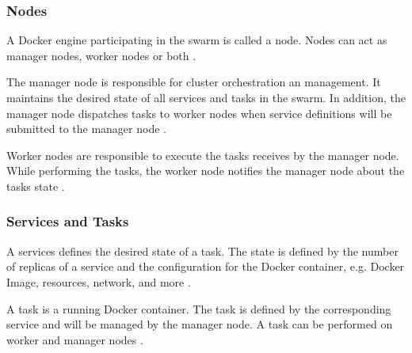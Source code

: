 \subsubsection{Nodes}
A Docker engine participating in the swarm is called a node.
Nodes can act as manager nodes, worker nodes or both \cite{Docker2020Docs}.


The manager node is responsible for cluster orchestration an management. It maintains the desired state of all services and tasks in the swarm. In addition, the manager node dispatches tasks to worker nodes when service definitions will be submitted to the manager node \cite{Docker2020Docs}.


Worker nodes are responsible to execute the tasks receives by the manager node. While performing the tasks, the worker node notifies the manager node about the tasks state \cite{Docker2020Docs}.


\subsubsection{Services and Tasks}
A services defines the desired state of a task. The state is defined by the number of replicas of a service and the configuration for the Docker container, e.g. Docker Image, resources, network, and more \cite{Docker2020Docs}.


A task is a running Docker container. The task is defined by the corresponding service and will be managed by the manager node. A task can be performed on worker and manager nodes \cite{Docker2020Docs}.


